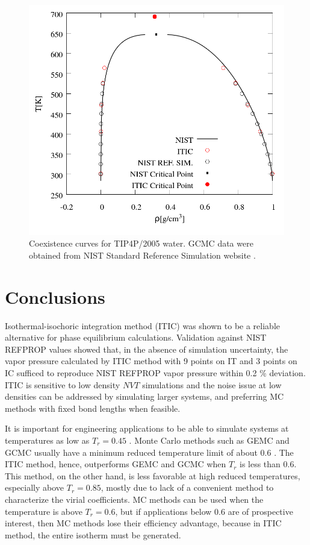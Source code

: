 \documentclass[%
 aip,
 jcp,
 sd,%
 amsmath,amssymb,
 reprint,%
]{revtex4-1}
\begin{document}
\begin{figure}
\includegraphics[scale=0.30]{Figures/EXAMPLE-SIM_TIP4P05_trho.png}
\caption{Coexistence curves for TIP4P/2005 water. GCMC data were obtained from NIST Standard Reference Simulation website \cite{Shen2008}.}
\label{fig:EXAMPLE-SIM/TIP4P05/T_rho}
\end{figure}



\section{Conclusions} \label{sec:conclusion} 
Isothermal-isochoric integration method (ITIC) was shown to be a reliable alternative for phase equilibrium calculations. Validation against NIST REFPROP values showed that, in the absence of simulation uncertainty, the vapor pressure calculated by ITIC method with 9 points on IT and 3 points on IC sufficed to reproduce NIST REFPROP vapor pressure within 0.2 \% deviation. ITIC is sensitive to low density $NVT$ simulations and the noise issue at low densities can be addressed by simulating larger systems, and preferring MC methods with fixed bond lengths when feasible.

It is important for engineering applications to be able to simulate systems at temperatures as low as $T_r=0.45$ \cite{Reid1987}. Monte Carlo methods such as GEMC and GCMC usually have a minimum reduced temperature limit of about 0.6 \cite{Martin1998}. The ITIC method, hence, outperforms GEMC and GCMC when $T_r$ is less than 0.6. This method, on the other hand, is less favorable at high reduced temperatures, especially above $T_r=0.85$, mostly due to lack of a convenient method to characterize the virial coefficients. MC methods can be used when the temperature is above $T_r=0.6$, but if applications below 0.6 are of prospective interest, then MC methods lose their efficiency advantage, because in ITIC  method, the entire isotherm must be generated. 
\end{document}
